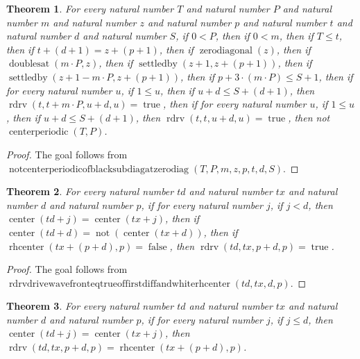 \documentclass[11pt]{article}
\newtheorem{theorem}{Theorem}[section]
\theoremstyle{definition}
\begin{document}
\begin{theorem}
\label{ll:paper:not-centerperiodic-of-black-subdiag-at-zero-diag}
For every natural number \(T\) and natural number \(P\) and natural number \(m\) and natural number \(z\) and natural number \(p\) and natural number \(t\) and natural number \(d\) and natural number \(S\), if \(0 < P\), then if \(0 < m\), then if \(T \le t\), then if \(t + (d + 1) = z + (p + 1)\), then if \(\operatorname{zerodiagonal}(z)\), then if \(\operatorname{doublesat}(m \cdot P, z)\), then if \(\operatorname{settledby}(z + 1, z + (p + 1))\), then if \(\operatorname{settledby}(z + 1 - m \cdot P, z + (p + 1))\), then if \(p + 3 \cdot (m \cdot P) \le S + 1\), then if for every natural number \(u\), if \(1 \le u\), then if \(u + d \le S + (d + 1)\), then \(\operatorname{rdrv}(t, t + m \cdot P, u + d, u) = \operatorname{true}\), then if for every natural number \(u\), if \(1 \le u\), then if \(u + d \le S + (d + 1)\), then \(\operatorname{rdrv}(t, t, u + d, u) = \operatorname{true}\), then not \(\operatorname{centerperiodic}(T, P)\).
\end{theorem}
\begin{proof}
The goal follows from \(\operatorname{notcenterperiodicofblacksubdiagatzerodiag}(T, P, m, z, p, t, d, S)\).
\end{proof}
\begin{theorem}
\label{ll:paper:rdrv-drive-wavefront-eq-true-of-first-diff-and-white-rhcenter}
For every natural number \(td\) and natural number \(tx\) and natural number \(d\) and natural number \(p\), if for every natural number \(j\), if \(j < d\), then \(\operatorname{center}(td + j) = \operatorname{center}(tx + j)\), then if \(\operatorname{center}(td + d) = \operatorname{not}(\operatorname{center}(tx + d))\), then if \(\operatorname{rhcenter}(tx + (p + d), p) = \operatorname{false}\), then \(\operatorname{rdrv}(td, tx, p + d, p) = \operatorname{true}\).
\end{theorem}
\begin{proof}
The goal follows from \(\operatorname{rdrvdrivewavefronteqtrueoffirstdiffandwhiterhcenter}(td, tx, d, p)\).
\end{proof}
\begin{theorem}
\label{ll:paper:rdrv-drive-wavefront-eq-rhcenter-of-center-prefix-eq}
For every natural number \(td\) and natural number \(tx\) and natural number \(d\) and natural number \(p\), if for every natural number \(j\), if \(j \le d\), then \(\operatorname{center}(td + j) = \operatorname{center}(tx + j)\), then \(\operatorname{rdrv}(td, tx, p + d, p) = \operatorname{rhcenter}(tx + (p + d), p)\).
\end{theorem}
\end{document}
